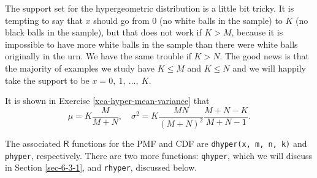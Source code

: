 \documentclass[captions=tableheading]{scrbook}
\begin{document}
The support set for the hypergeometric distribution is a little bit tricky. It is tempting to say that \(x\) should go from 0 (no white balls in the sample) to \(K\) (no black balls in the sample), but that does not work if \(K>M\), because it is impossible to have more white balls in the sample than there were white balls originally in the urn. We have the same trouble if \(K>N\). The good news is that the majority of examples we study have \(K\leq M\) and \(K\leq N\) and we will happily take the support to be \(x=0,\ 1,\ \ldots,\ K\). 

It is shown in Exercise \ref{xca-hyper-mean-variance} that
\begin{equation}
\mu=K\frac{M}{M+N},\quad \sigma^{2}=K\frac{MN}{(M+N)^{2}}\frac{M+N-K}{M+N-1}.
\end{equation}

The associated \(\mathsf{R}\) functions for the PMF and CDF are \texttt{dhyper(x, m, n, k)} and \texttt{phyper}, respectively. There are two more functions: \texttt{qhyper}, which we will discuss in Section \ref{sec-6-3-1}, and \texttt{rhyper}, discussed below.
\end{document}
